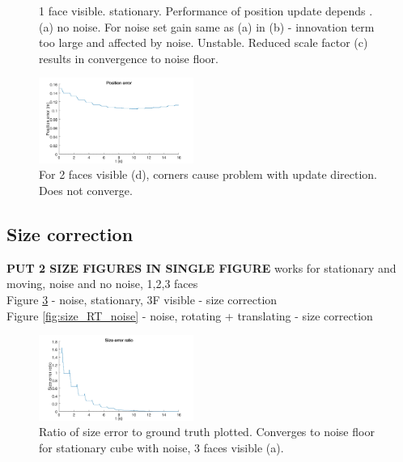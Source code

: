 \begin{figure}
{\begin{minipage}[b]{0.45\columnwidth}
 	\end{minipage}}
 	\caption{1 face visible. stationary. Performance of position update depends . (a) no noise. For noise set gain same as (a) in (b) - innovation term too large and affected by noise. Unstable. Reduced scale factor (c) results in convergence to noise floor.}
 	\label{fig:position_update_1F}
\end{figure}

\begin{figure}
\centering
	\includegraphics[width=0.45\textwidth,trim = 0mm 0mm 0mm 0mm,clip]{./Figures/position_error_4_stationary_2F}\vspace*{0ex}
	\caption{ For 2 faces visible (d), corners cause problem with update direction. Does not converge. }
  	\label{fig:position_error_4_stationary_2F}
\end{figure}

\subsection{Size correction}
\textbf{PUT 2 SIZE FIGURES IN SINGLE FIGURE}
works for stationary and moving, noise and no noise, 1,2,3 faces\\
Figure \ref{fig:size_stationary}  - noise, stationary, 3F visible - size correction\\
Figure \ref{fig:size_RT_noise}  - noise, rotating + translating - size correction\\

\begin{figure}
	\centering
  	\includegraphics[width=0.45\textwidth,trim = 0mm 0mm 0mm 0mm,clip]{./Figures/size_error_ratio_1}\vspace*{0ex}
	\caption{Ratio of size error to ground truth plotted. Converges to noise floor for stationary cube with noise, 3 faces visible (a).}
  	\label{fig:size_stationary}
\end{figure}

